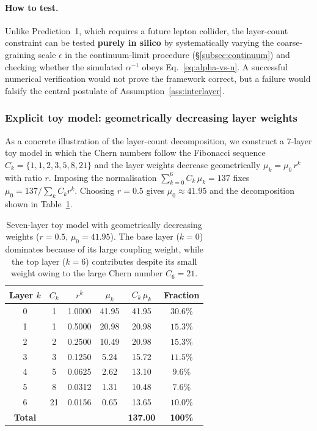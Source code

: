 \documentclass[11pt,a4paper]{article}
\theoremstyle{definition}
\theoremstyle{remark}
\begin{document}
\paragraph{How to test.}  Unlike Prediction~1, which requires a future
lepton collider, the layer-count constraint can be tested \textbf{purely in
silico} by systematically varying the coarse-graining scale $\epsilon$ in
the continuum-limit procedure (\S\ref{subsec:continuum}) and checking whether
the simulated $\alpha^{-1}$ obeys Eq.~\eqref{eq:alpha-vs-n}.  A successful
numerical verification would not prove the framework correct, but a failure
would falsify the central postulate of Assumption~\ref{ass:interlayer}.

\subsubsection{Explicit toy model: geometrically decreasing layer weights}
\label{subsubsec:toy-model-geometric}

As a concrete illustration of the layer-count decomposition, we construct a
7-layer toy model in which the Chern numbers follow the Fibonacci sequence
$C_{k}=\{1,1,2,3,5,8,21\}$ and the layer weights decrease geometrically
$\mu_{k}=\mu_{0}\,r^{k}$ with ratio $r$.  Imposing the normalisation
$\sum_{k=0}^{6}C_{k}\,\mu_{k}=137$ fixes $\mu_{0}=137/\sum_{k}C_{k}r^{k}$.
Choosing $r=0.5$ gives $\mu_{0}\approx 41.95$ and the decomposition shown
in Table~\ref{tab:geometric}.

\begin{table}[htbp]
\centering
\caption{Seven-layer toy model with geometrically decreasing weights
($r=0.5$, $\mu_{0}=41.95$).  The base layer ($k=0$) dominates because of its
large coupling weight, while the top layer ($k=6$) contributes despite its
small weight owing to the large Chern number $C_{6}=21$.}
\label{tab:geometric}
\begin{tabular}{@{}cccccc@{}}
\toprule
\textbf{Layer $k$} & $C_{k}$ & $r^{k}$ & $\mu_{k}$ & $C_{k}\,\mu_{k}$ & \textbf{Fraction} \\
\midrule
0 & 1  & 1.0000 & 41.95 & 41.95 & $30.6\%$ \\
1 & 1  & 0.5000 & 20.98 & 20.98 & $15.3\%$ \\
2 & 2  & 0.2500 & 10.49 & 20.98 & $15.3\%$ \\
3 & 3  & 0.1250 & 5.24  & 15.72 & $11.5\%$ \\
4 & 5  & 0.0625 & 2.62  & 13.10 & $9.6\%$  \\
5 & 8  & 0.0312 & 1.31  & 10.48 & $7.6\%$  \\
6 & 21 & 0.0156 & 0.65  & 13.65 & $10.0\%$ \\
\midrule
\textbf{Total} & & & & \textbf{137.00} & \textbf{100\%} \\
\bottomrule
\end{tabular}
\end{table}
\end{document}
